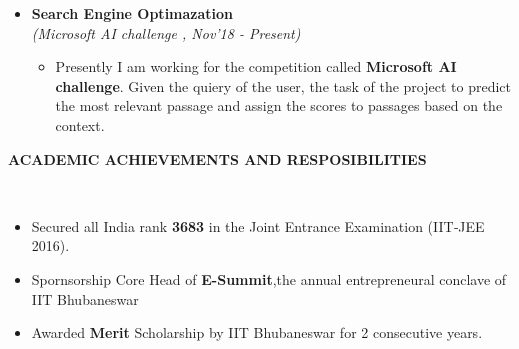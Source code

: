 \documentclass[a4paper,10pt]{article}
\newcommand{\isep}{-2 pt}
\newcommand{\lsep}{-0.5cm}
\newcommand{\resheading}[1]{{\small \colorbox{mygrey}{\begin{minipage}{0.975\textwidth}{\textbf{#1 \vphantom{p\^{E}}}}\end{minipage}}}}
\begin{document}
\begin{itemize}
\item \textbf{Search Engine Optimazation}\\
 \emph{(Microsoft AI challenge
, Nov'18 - Present)} \\[-0.6cm]
	\begin{itemize}\itemsep \isep
	\item Presently I am working for the competition called \textbf{Microsoft AI challenge}. Given the quiery of the user, the task of the project to predict the most relevant passage and assign the scores to passages based on the context.
	\end{itemize}
\end{itemize}

\resheading{\textbf{ACADEMIC ACHIEVEMENTS AND RESPOSIBILITIES} }\\[\lsep]
\bigbreak
\begin{itemize}
\item \noindent Secured all India rank \textbf{3683} in the Joint Entrance Examination (IIT‐JEE 2016). 
\item \noindent Spornsorship Core Head of \textbf{E-Summit},the annual entrepreneural conclave of IIT Bhubaneswar
\item \noindent Awarded \textbf{Merit} Scholarship by IIT Bhubaneswar for 2 consecutive years.
\end{itemize}
\end{document}
